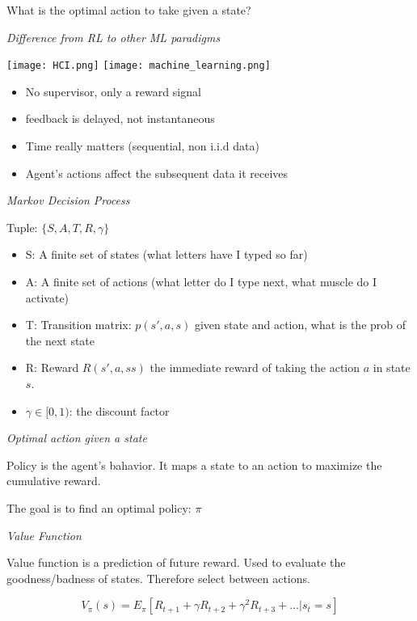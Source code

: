 What is the optimal action to take given a state? \smallskip


\textit{Difference from RL to other ML paradigms} \smallskip

\begin{minipage}{\linewidth} 
	\centering
	\texttt{[image: HCI.png]}
	\quad 
	\texttt{[image: machine\_learning.png]}
  \end{minipage}

\begin{itemize}[itemsep=-5pt, topsep=0pt, leftmargin=*]
	\item No supervisor, only a reward signal
	\item feedback is delayed, not instantaneous
	\item Time really matters (sequential, non i.i.d data)
	\item Agent's actions affect the subsequent data it receives
\end{itemize}

\textit{Markov Decision Process} \smallskip

Tuple: $\{S, A, T, R, \gamma\}$

\begin{itemize}[itemsep=-5pt, topsep=0pt, leftmargin=*]
	\item S: A finite set of states (what letters have I typed so far)
	\item A: A finite set of actions (what letter do I type next, what muscle do I activate)
	\item T: Transition matrix: $p(s', a, s)$ given state and action, what is the prob of the next state
	\item R: Reward $R(s', a, ss)$ the immediate reward of taking the action $a$ in state $s$. 
	\item $\gamma \in [0, 1)$: the discount factor
\end{itemize}


\textit{Optimal action given a state} \smallskip

Policy is the agent's bahavior. It maps a state to an action to maximize the cumulative reward. 

The goal is to find an optimal policy: $\pi$ \smallbreak

\textit{Value Function} \smallskip

Value function is a prediction of future reward. Used to evaluate the goodness/badness of states. Therefore select between actions. 

$$V_{\pi}(s) = E_{\pi}[R_{t+1} + \gamma R_{t+2} + \gamma^2 R_{t+3} + ... | s_{t} = s]$$

